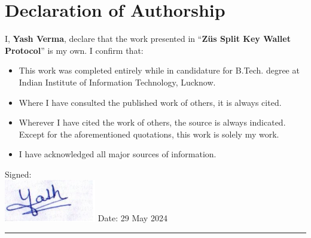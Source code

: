 \setcounter{page}{3}
\chapter*{Declaration of Authorship}
\vspace{1cm}
\noindent I, \textbf{Yash Verma}, declare that the work presented in ``\textbf{Züs Split Key Wallet Protocol}'' is my own. I confirm that:
\medskip
\begin{itemize}
    \item This work was completed entirely while in candidature for B.Tech. degree at Indian Institute of Information Technology, Lucknow.
    \medskip
    \item Where I have consulted the published work of others, it is always cited.
    \medskip
    \item Wherever I have cited the work of others, the source is always indicated. Except for the aforementioned quotations, this work is solely my work.
    \medskip
    \item I have acknowledged all major sources of information.
\end{itemize}
\vspace{2cm}
\noindent Signed:\\
\includegraphics[width=0.3\textwidth]{Images/signature}
\newline
\newline
\newline
\noindent Date: 29 May 2024
\\
\rule[0.5em]{33em}{0.5pt}
\cleardoublepage
